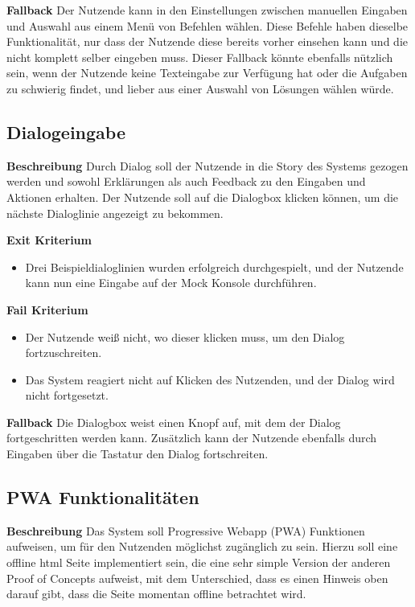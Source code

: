 \textbf{Fallback}
\newline Der Nutzende kann in den Einstellungen zwischen manuellen Eingaben und Auswahl aus einem Menü von Befehlen wählen. Diese Befehle haben dieselbe Funktionalität, nur dass der Nutzende diese bereits vorher einsehen kann und die nicht komplett selber eingeben muss.
Dieser Fallback könnte ebenfalls nützlich sein, wenn der Nutzende keine Texteingabe zur Verfügung hat oder die Aufgaben zu schwierig findet, und lieber aus einer Auswahl von Lösungen wählen würde.

\subsection{Dialogeingabe}
\label{sec:poc_dialogue}
\textbf{Beschreibung}
Durch Dialog soll der Nutzende in die Story des Systems gezogen werden und sowohl Erklärungen als auch Feedback zu den Eingaben und Aktionen erhalten. Der Nutzende soll auf die Dialogbox klicken können, um die nächste Dialoglinie angezeigt zu bekommen.
\newline 

\textbf{Exit Kriterium}
\begin{itemize}
    \item Drei Beispieldialoglinien wurden erfolgreich durchgespielt, und der Nutzende kann nun eine Eingabe auf der Mock Konsole durchführen.

\end{itemize}

\textbf{Fail Kriterium}
\begin{itemize}
    \item Der Nutzende weiß nicht, wo dieser klicken muss, um den Dialog fortzuschreiten.
    \item Das System reagiert nicht auf Klicken des Nutzenden, und der Dialog wird nicht fortgesetzt.
\end{itemize}

\textbf{Fallback}
\newline Die Dialogbox weist einen Knopf auf, mit dem der Dialog fortgeschritten werden kann. Zusätzlich kann der Nutzende ebenfalls durch Eingaben über die Tastatur den Dialog fortschreiten.

\subsection{PWA Funktionalitäten}
\label{sec:poc_pwa}
\textbf{Beschreibung}
\newline Das System soll Progressive Webapp (PWA) Funktionen aufweisen, um für den Nutzenden möglichst zugänglich zu sein. Hierzu soll eine offline \gls{html} Seite implementiert sein, die eine sehr simple Version der anderen Proof of Concepts aufweist, mit dem Unterschied, dass es einen Hinweis oben darauf gibt, dass die Seite momentan offline betrachtet wird.

